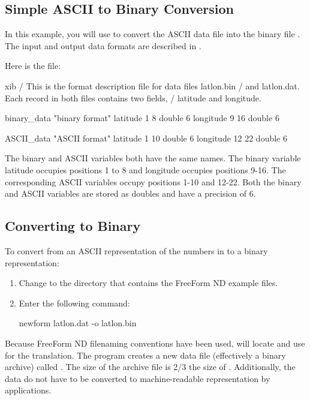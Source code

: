 \subsection{Simple ASCII to Binary Conversion}

In this example, you will use  to convert the ASCII data
file  into the binary file . The input
and output data formats are described in .

Here is the  file:

\nopagebreak
\begin{vcode}{xib}
/ This is the format description file for data files latlon.bin 
/ and latlon.dat. Each record in both files contains two fields, 
/ latitude and longitude.

binary_data "binary format"
latitude 1 8 double 6
longitude 9 16 double 6

ASCII_data "ASCII format"
latitude 1 10 double 6
longitude 12 22 double 6
\end{vcode}

The binary and ASCII variables both have the same names. The binary
variable latitude occupies positions 1 to 8 and longitude occupies
positions 9-16. The corresponding ASCII variables occupy positions
1-10 and 12-22. Both the binary and ASCII variables are stored as
doubles and have a precision of 6.

\subsection{Converting to Binary}

To convert from an ASCII representation of the numbers in
 to a binary representation:

\begin{enumerate}
\item Change to the directory that contains the FreeForm ND example files. 

\item Enter the following command: 

\begin{example}
newform latlon.dat -o latlon.bin 
\end{example}

\end{enumerate}

Because FreeForm ND filenaming conventions have been used,
 will locate and use  for the
translation. The  program creates a new data file
(effectively a binary archive) called . The size of
the archive file is 2/3 the size of . Additionally,
the data do not have to be converted to machine-readable
representation by applications.

